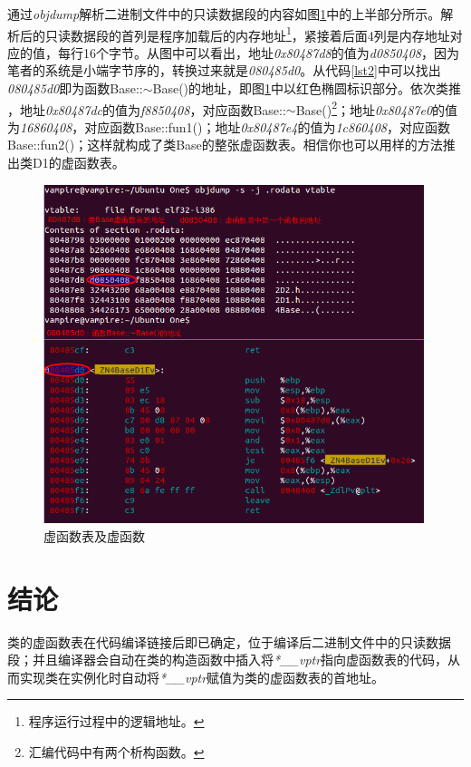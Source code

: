 \documentclass[a4paper, 12pt, titlepage]{article}
\newlength{\du}
\begin{document}
通过\emph{objdump}解析二进制文件中的只读数据段的内容如图\ref{fig3}中的上半部分所示。解析后的只读数据段的首列是程序加载后的内存地址\footnote{程序运行过程中的逻辑地址。}，紧接着后面4列是内存地址对应的值，每行16个字节。从图中可以看出，地址\emph{0x80487d8}的值为\emph{{\color{blue}d0850408}}，因为笔者的系统是小端字节序的，转换过来就是\emph{{\color{blue}080485d0}}。从代码\ref{lst2}中可以找出\emph{{\color{blue}080485d0}}即为函数Base::$\sim$Base()的地址，即图\ref{fig3}中以红色椭圆标识部分。依次类推 ，地址\emph{0x80487dc}的值为\emph{{\color{blue}f8850408}}，对应函数Base::$\sim$Base()\footnote{汇编代码中有两个析构函数。}；地址\emph{0x80487e0}的值为\emph{{\color{blue}16860408}}，对应函数Base::fun1()；地址\emph{0x80487e4}的值为\emph{{\color{blue}1c860408}}，对应函数Base::fun2()；这样就构成了类Base的整张虚函数表。相信你也可以用样的方法推出类D1的虚函数表。
\begin{figure}[H]
  \setlength{\abovecaptionskip}{0pt}
  \centering
  \includegraphics[width=0.99\textwidth]{vptr.png}
  \caption{虚函数表及虚函数}
  \label{fig3}
\end{figure}

\section{结论}
类的虚函数表在代码编译链接后即已确定，位于编译后二进制文件中的只读数据段；并且编译器会自动在类的构造函数中插入将\emph{*\_\_vptr}指向虚函数表的代码，从而实现类在实例化时自动将\emph{*\_\_vptr}赋值为类的虚函数表的首地址。
\end{document}
